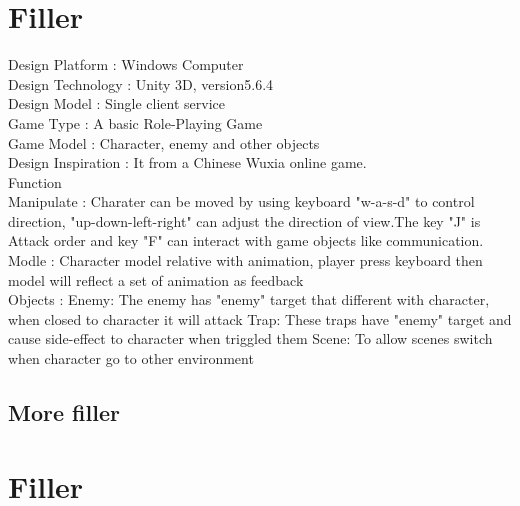 \section{Filler}
Design Platform
:
Windows Computer
\\
Design Technology
:
Unity 3D, version5.6.4
\\
Design Model
:
Single client service
\\
Game Type
:
A basic Role-Playing Game
\\
Game Model
:
Character, enemy and other objects
\\
Design Inspiration
:
It from a Chinese Wuxia online game.
\\
Function
\\
Manipulate
:
Charater can be moved by using keyboard "w-a-s-d" to control direction, "up-down-left-right" can adjust the direction of view.The key "J" is Attack order and key "F" can interact with game objects like communication.
\\
Modle
:
Character model relative with animation, player press keyboard then model will reflect a set of animation as feedback
\\
Objects
:
Enemy: The enemy has "enemy" target that different with character, when closed to character it will attack Trap: These traps have "enemy" target and cause side-effect to character when triggled them Scene: To allow scenes switch when character go to other environment

\subsection{More filler}


\section{Filler}

